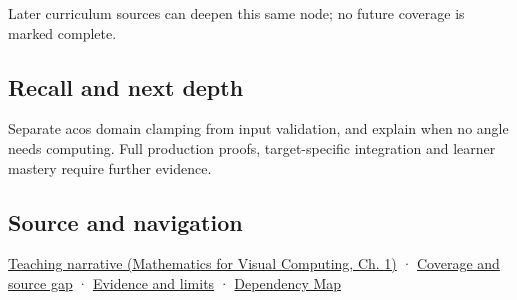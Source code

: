 Later curriculum sources can deepen this same node; no future coverage is marked complete.

\subsection{Recall and next depth}\label{appendix-e569e60e18e6-recall-and-next-depth}

Separate acos domain clamping from input validation, and explain when no angle needs computing. Full production proofs, target-specific integration and learner mastery require further evidence.

\subsection{Source and navigation}\label{appendix-e569e60e18e6-source-and-navigation}

\href{../02-Mathematics-for-Visual-Computing/main.pdf\#nameddest=01-foundations-i-ch017-an-angle-is-a-question-with-a-domain}{Teaching narrative (Mathematics for Visual Computing, Ch. 1)} · \hyperref[appendix-fd090d982a15-phase-6---parts-501-600]{Coverage and source gap} · \hyperref[appendix-a103e7846d21-phase-6---source-analysis-and-verification]{Evidence and limits} · \hyperref[appendix-4ad47bdd269a]{Dependency Map}
